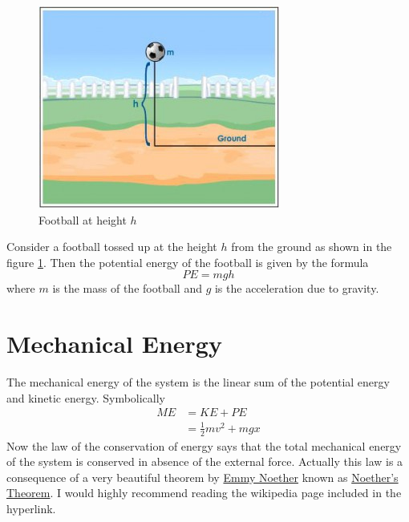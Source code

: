\documentclass[10pt]{article}
\begin{document}
\begin{figure}[h]
\includegraphics[scale=.5]{potenergyfootball}
\centering
\caption{Football at height $h$}
\label{potfootball}
\centering
\end{figure}
Consider a football tossed up at the height $h$ from the ground as shown in the figure \ref{potfootball}.  Then the potential energy of the football is given by the formula
\begin{equation}
  PE = mgh
\end{equation}
where $m$ is the mass of the football and $g$ is the acceleration due to gravity.
\section{Mechanical Energy}
The mechanical energy of the system is the linear sum of the potential energy and kinetic energy.  Symbolically
\begin{equation}
\begin{split}
  ME &= KE + PE\\
&= \frac{1}{2}mv^2 + mgx
\end{split}
\end{equation}
Now the law of the conservation of energy says that the total mechanical energy of the system is conserved in absence of the external force.  Actually this law is a consequence of a very beautiful theorem by \href{https://en.wikipedia.org/wiki/Emmy_Noether}{Emmy Noether} known as \href{https://en.wikipedia.org/wiki/Noether%27s_theorem}{Noether's Theorem}.  I would highly recommend reading the wikipedia page included in the hyperlink.  
\end{document}

